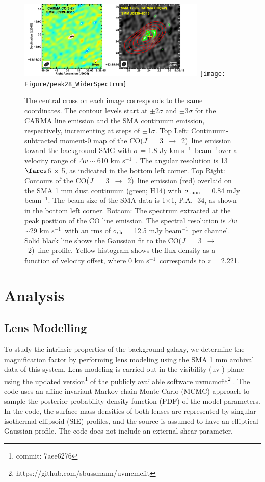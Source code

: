 \documentclass[twocolumn,apj,numberedappendix]{emulateapj}
\newcommand{\CO}{\mbox{CO($J$ = 3 $\rightarrow$ 2) }}
\newcommand{\pmOne}{$^{-1}$}
\begin{document}
\begin{figure}[tbph] 
\centering
\includegraphics[width=0.8\textwidth]{Figure/LinePanel}
\texttt{[image: Figure/peak28\_WiderSpectrum]}
\caption{The central cross on each image corresponds to the same coordinates. The contour levels start at $\pm$2$\sigma$ and $\pm$3$\sigma$ for the CARMA line emission and the SMA continuum emission, respectively, incrementing at
steps of $\pm$1$\sigma$. Top Left: Continuum-subtracted moment-0 map of the \CO line emission toward 
the background SMG with $\sigma$ = 1.8 Jy km s\pmOne\ beam\pmOne over a velocity range of $\Delta v\sim$610 km s\pmOne\ . The angular resolution is 13$\farcs$6 $\times$ 
5, as indicated in the bottom left corner. 
Top Right: Contours of the \CO line emission (red) overlaid on the SMA 1 mm dust continuum (green; H14) with $\sigma_{\rm 1 mm}$ = 0.84 mJy beam\pmOne. The beam size of the SMA data is 1$ \times $1, P.A. -34\degr, as shown 
in the bottom left corner. Bottom: 
The spectrum extracted at the peak position of the CO line emission. The spectral resolution is $\Delta v$ $\sim$29 km s\pmOne\ with an rms of $\sigma_{\rm ch}$ = 12.5 mJy beam\pmOne\ per channel.
Solid black line shows the Gaussian fit to the \CO line profile. Yellow histogram shows the 
flux density as a function of velocity offset, where 0 km s\pmOne\ corresponds to $z$ = 2.221. \label{fig:mom0}}
\end{figure}


\section{Analysis}
\subsection{Lens Modelling} \label{sec:Lens} 
To study the intrinsic properties of the background galaxy, we determine the magnification factor by performing
lens modeling using the SMA 1 mm archival data of this system. Lens modeling is carried out in the visibility
(uv-) plane using the updated version\footnote{commit: 7aee6276} of the publicly available software {\sc uvmcmcfit}\footnote{https://github.com/sbussmann/uvmcmcfit}
\citep{Bussmann15a}. The code uses an affine-invariant Markov chain Monte Carlo (MCMC) approach to sample the posterior
probability density function (PDF) of the model parameters. In the code, the surface mass densities of both
lenses are represented by singular isothermal ellipsoid (SIE) profiles, and the source is assumed to have an
elliptical Gaussian profile. The code does not include an external shear parameter.
\end{document}

